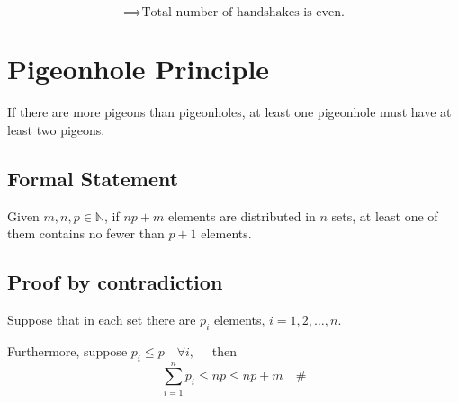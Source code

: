 \documentclass[11pt]{article}
\begin{document}
\[
\implies \text{Total number of handshakes is even.}
\]

\section{Pigeonhole Principle}

If there are more pigeons than pigeonholes, at least one pigeonhole must have at least two pigeons.

\subsection*{Formal Statement}
Given $m, n, p \in \mathbb{N}$, if $np + m$ elements are distributed in $n$ sets, at least one of them contains no fewer than $p + 1$ elements.

\subsection{\textbf{Proof} by contradiction}
Suppose that in each set there are $p_i$ elements, $i = 1, 2, \dots, n$.

Furthermore, suppose $p_i \leq p \quad \forall i, \quad$ then
\[
\sum_{i=1}^{n} p_i \leq n p \leq n p + m \quad \# 
\]
\end{document}
